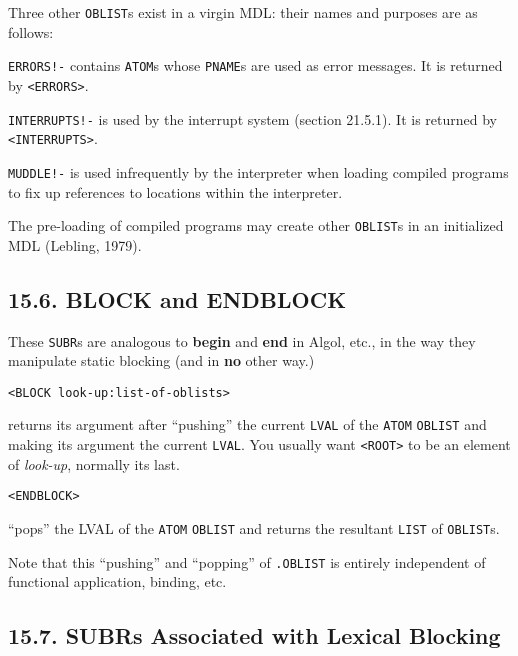 \documentclass[a4paper,]{article}
\begin{document}
Three other \texttt{OBLIST}s exist in a virgin MDL: their names and purposes are as follows:

\texttt{ERRORS!-} contains \texttt{ATOM}s whose \texttt{PNAME}s are used as error messages. It is returned by
\texttt{\textless{}ERRORS\textgreater{}}.

\texttt{INTERRUPTS!-} is used by the interrupt system (section 21.5.1). It is returned by
\texttt{\textless{}INTERRUPTS\textgreater{}}.

\texttt{MUDDLE!-} is used infrequently by the interpreter when loading compiled programs to
fix up references to locations within the interpreter.

The pre-loading of compiled programs may create other \texttt{OBLIST}s in an initialized MDL (Lebling, 1979).

\subsection{15.6. BLOCK and ENDBLOCK}\label{block-and-endblock}

These \texttt{SUBR}s are analogous to \textbf{begin} and \textbf{end} in Algol, etc., in the way they manipulate static
blocking (and in \textbf{no} other way.)

\begin{verbatim}
<BLOCK look-up:list-of-oblists>
\end{verbatim}

 returns its argument after ``pushing'' the current \texttt{LVAL} of the \texttt{ATOM}
\texttt{OBLIST} and making its argument the current \texttt{LVAL}. You usually want \texttt{\textless{}ROOT\textgreater{}}
to be an element of \emph{look-up}, normally its last.

\begin{verbatim}
<ENDBLOCK>
\end{verbatim}

 ``pops'' the LVAL of the \texttt{ATOM} \texttt{OBLIST} and returns the resultant
\texttt{LIST} of \texttt{OBLIST}s.

Note that this ``pushing'' and ``popping'' of \texttt{.OBLIST} is entirely independent of functional application, binding,
etc.

\subsection{15.7. SUBRs Associated with Lexical Blocking}\label{subrs-associated-with-lexical-blocking}
\end{document}
